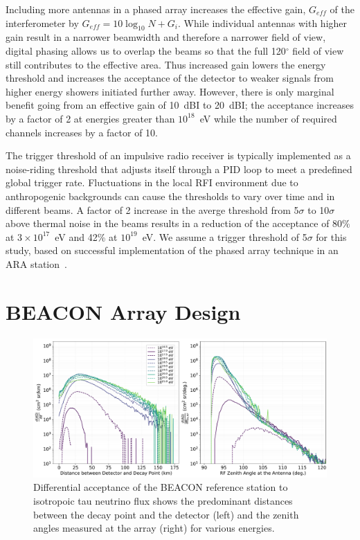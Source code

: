 \documentclass{PoS}
\begin{document}
Including more antennas in a phased array increases the effective gain, $G_{eff}$ of the interferometer by $G_{eff} = 10 \log_{10} N + G_i$. While individual antennas with higher gain result in a narrower beamwidth and therefore a narrower field of view, digital phasing allows us to overlap the beams so that the full 120$^{\circ}$ field of view still contributes to the effective area. Thus increased gain lowers the energy threshold and increases the acceptance of the detector to weaker signals from higher energy showers initiated further away. However, there is only marginal benefit going from an effective gain of 10~dBI to 20~dBI; the acceptance increases by a factor of  2 at energies greater than $10^{18}$~eV while the number of required channels increases by a factor of 10. 

The trigger threshold of an impulsive radio receiver is typically implemented as a noise-riding threshold that adjusts itself through a PID loop to meet a predefined global trigger rate. Fluctuations in the local RFI environment due to anthropogenic backgrounds can cause the thresholds to vary over time and in different beams. A factor of 2 increase in the averge threshold from 5$\sigma$ to 10$\sigma$ above thermal noise in the beams results in a reduction of the acceptance of 80\% at $3\times10^{17}$~eV and 42\% at $10^{19}$~eV. We assume a trigger threshold of 5$\sigma$ for this study, based on successful implementation of the phased array technique in an ARA station~\cite{oberla_phased}.

\section{BEACON Array Design}\label{sec:array} 
\begin{figure}[tbhp]
\begin{center}
\includegraphics[width=\textwidth]{figures/diffacceptance_30-80MHz_refdesign}
\caption{Differential acceptance of the BEACON reference station to isotropoic tau neutrino flux shows the predominant distances between the decay point and the detector (left) and the zenith angles measured at the array (right) for various energies.}
\label{fig:diffaccep}
\end{center}
\end{figure}
\end{document}
